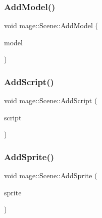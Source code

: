 \hypertarget{classmage_1_1_scene_acfd5cf0484e1814cb265604ed970335f}{}\label{classmage_1_1_scene_acfd5cf0484e1814cb265604ed970335f} 
\subsubsection{\texorpdfstring{Add\+Model()}{AddModel()}}
{\footnotesize\ttfamily void mage\+::\+Scene\+::\+Add\+Model (\begin{DoxyParamCaption}\item[{\hyperlink{namespacemage_a1e01ae66713838a7a67d30e44c67703e}{Shared\+Ptr}$<$ \hyperlink{classmage_1_1_model_node}{Model\+Node} $>$}]{model }\end{DoxyParamCaption})\hspace{0.3cm}{\ttfamily [private]}}

\hypertarget{classmage_1_1_scene_ab97b66c81c32681699052e154d0e0722}{}\label{classmage_1_1_scene_ab97b66c81c32681699052e154d0e0722} 
\subsubsection{\texorpdfstring{Add\+Script()}{AddScript()}}
{\footnotesize\ttfamily void mage\+::\+Scene\+::\+Add\+Script (\begin{DoxyParamCaption}\item[{\hyperlink{namespacemage_a1e01ae66713838a7a67d30e44c67703e}{Shared\+Ptr}$<$ \hyperlink{classmage_1_1_behavior_script}{Behavior\+Script} $>$}]{script }\end{DoxyParamCaption})}

\hypertarget{classmage_1_1_scene_a735a4eba6bf6a072195f1cfc58dfca47}{}\label{classmage_1_1_scene_a735a4eba6bf6a072195f1cfc58dfca47} 
\subsubsection{\texorpdfstring{Add\+Sprite()}{AddSprite()}}
{\footnotesize\ttfamily void mage\+::\+Scene\+::\+Add\+Sprite (\begin{DoxyParamCaption}\item[{\hyperlink{namespacemage_a1e01ae66713838a7a67d30e44c67703e}{Shared\+Ptr}$<$ \hyperlink{classmage_1_1_sprite_object}{Sprite\+Object} $>$}]{sprite }\end{DoxyParamCaption})}

